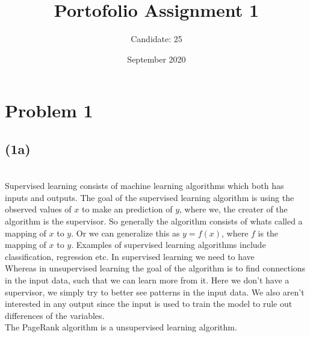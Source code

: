 \documentclass[12pt, letterpaper]{article}
\title{Portofolio Assignment 1}
\author{Candidate: 25}
\date{September 2020}
\begin{document}
  \maketitle
  \section*{Problem 1}
    \subsection*{(1a)} \\
      Supervised learning consists of machine learning algorithms which both has inputs and outputs. The goal of the supervised learning algorithm is using the observed values of $x$ to make an prediction of $y$, where we, the creater of the algorithm is the supervisor. So generally the algorithm consists of whats called a mapping of $x$ to $y$. Or we can generalize this as $y = f(x)$, where $f$ is the mapping of $x$ to $y$. Examples of supervised learning algorithms include classification, regression etc. In supervised learning we need to have \\
      \newline
      Whereas in unsupervised learning the goal of the algorithm is to find connections in the input data, such that we can learn more from it. Here we don't have a supervisor, we simply try to better see patterns in the input data. We also aren't interested in any output since the input is used to train the model to rule out differences of the variables.\\
      \newline
      The PageRank algorithm is a unsupervised learning algorithm.

      \newline
\end{document}
